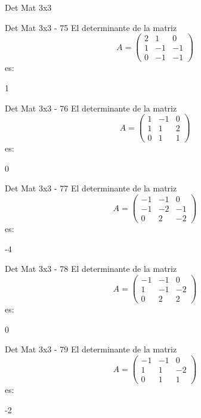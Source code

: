 \documentclass[a4,11pt]{aleph-notas}
\begin{document}
\begin{quiz}{Det Mat 3x3}
\begin{numerical}[tolerance=0]%
    {Det Mat 3x3 - 75}
    El determinante de la matriz
    \[
        A = \begin{pmatrix} 2 & 1 & 0 \\ 1 & -1 & -1 \\ 0 & -1 & -1 \end{pmatrix}
    \]
    es:
    \item[] 1
\end{numerical}

\begin{numerical}[tolerance=0]%
    {Det Mat 3x3 - 76}
    El determinante de la matriz
    \[
        A = \begin{pmatrix} 1 & -1 & 0 \\ 1 & 1 & 2 \\ 0 & 1 & 1 \end{pmatrix}
    \]
    es:
    \item[] 0
\end{numerical}

\begin{numerical}[tolerance=0]%
    {Det Mat 3x3 - 77}
    El determinante de la matriz
    \[
        A = \begin{pmatrix} -1 & -1 & 0 \\ -1 & -2 & -1 \\ 0 & 2 & -2 \end{pmatrix}
    \]
    es:
    \item[] -4
\end{numerical}

\begin{numerical}[tolerance=0]%
    {Det Mat 3x3 - 78}
    El determinante de la matriz
    \[
        A = \begin{pmatrix} -1 & -1 & 0 \\ 1 & -1 & -2 \\ 0 & 2 & 2 \end{pmatrix}
    \]
    es:
    \item[] 0
\end{numerical}

\begin{numerical}[tolerance=0]%
    {Det Mat 3x3 - 79}
    El determinante de la matriz
    \[
        A = \begin{pmatrix} -1 & -1 & 0 \\ 1 & 1 & -2 \\ 0 & 1 & 1 \end{pmatrix}
    \]
    es:
    \item[] -2
\end{numerical}


\end{quiz}
\end{document}
